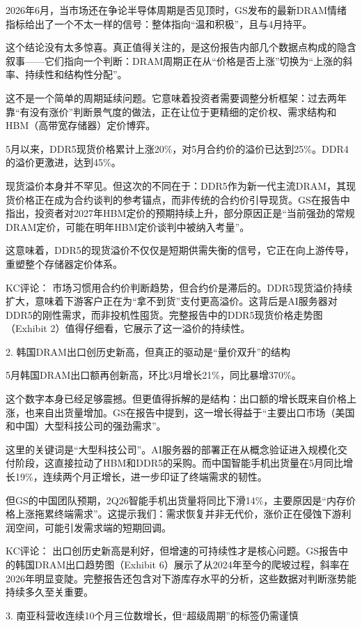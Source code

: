 \documentclass[11pt]{ctexart}
\begin{document}
2026年6月，当市场还在争论半导体周期是否见顶时，GS发布的最新DRAM情绪指标给出了一个不太一样的信号：整体指向“温和积极”，且与4月持平。

这个结论没有太多惊喜。真正值得关注的，是这份报告内部几个数据点构成的隐含叙事——它们指向一个判断：DRAM周期正在从“价格是否上涨”切换为“上涨的斜率、持续性和结构性分配”。

这不是一个简单的周期延续问题。它意味着投资者需要调整分析框架：过去两年靠“有没有涨价”判断景气度的做法，正在让位于更精细的定价权、需求结构和HBM（高带宽存储器）定价博弈。

5月以来，DDR5现货价格累计上涨20\%，对5月合约价的溢价已达到25\%。DDR4的溢价更激进，达到45\%。

现货溢价本身并不罕见。但这次的不同在于：DDR5作为新一代主流DRAM，其现货价格正在成为合约谈判的参考锚点，而非传统的合约价引导现货。GS在报告中指出，投资者对2027年HBM定价的预期持续上升，部分原因正是“当前强劲的常规DRAM定价，可能在明年HBM定价谈判中被纳入考量”。

这意味着，DDR5的现货溢价不仅仅是短期供需失衡的信号，它正在向上游传导，重塑整个存储器定价体系。

KC评论： 市场习惯用合约价判断趋势，但合约价是滞后的。DDR5现货溢价持续扩大，意味着下游客户正在为“拿不到货”支付更高溢价。这背后是AI服务器对DDR5的刚性需求，而非投机性囤货。完整报告中的DDR5现货价格走势图（Exhibit 2）值得仔细看，它展示了这一溢价的持续性。

2. 韩国DRAM出口创历史新高，但真正的驱动是“量价双升”的结构

5月韩国DRAM出口额再创新高，环比3月增长21\%，同比暴增370\%。

这个数字本身已经足够震撼。但更值得拆解的是结构：出口额的增长既来自价格上涨，也来自出货量增加。GS在报告中提到，这一增长得益于“主要出口市场（美国和中国）大型科技公司的强劲需求”。

这里的关键词是“大型科技公司”。AI服务器的部署正在从概念验证进入规模化交付阶段，这直接拉动了HBM和DDR5的采购。而中国智能手机出货量在5月同比增长19\%，连续两个月正增长，进一步印证了终端需求的韧性。

但GS的中国团队预期，2Q26智能手机出货量将同比下滑14\%，主要原因是“内存价格上涨拖累终端需求”。这提示我们：需求恢复并非无代价，涨价正在侵蚀下游利润空间，可能引发需求端的短期回调。

KC评论： 出口创历史新高是利好，但增速的可持续性才是核心问题。GS报告中的韩国DRAM出口趋势图（Exhibit 6）展示了从2024年至今的爬坡过程，斜率在2026年明显变陡。完整报告还包含对下游库存水平的分析，这些数据对判断涨势能持续多久至关重要。

3. 南亚科营收连续10个月三位数增长，但“超级周期”的标签仍需谨慎
\end{document}
